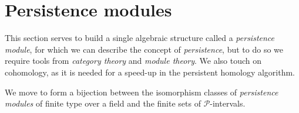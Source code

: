 \section{Persistence modules}

This section serves to build a single algebraic structure called a \emph{persistence module}, for which we can describe the concept of \emph{persistence}, but to do so we require tools from \emph{category theory} and \emph{module theory}. We also touch on cohomology, as it is needed for a speed-up in the persistent homology algorithm. 

We move to form a bijection between the isomorphism classes of \emph{persistence modules} of finite type over a field and the finite sets of $\mathcal P$-intervals.




